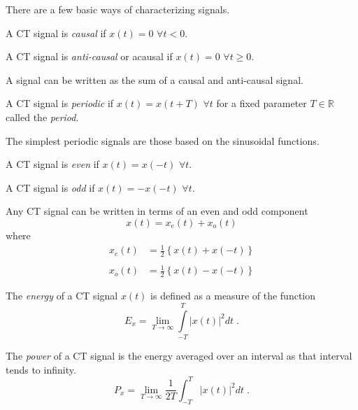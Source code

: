 There are a few basic ways of characterizing signals.

\begin{definition}
  A CT signal is \emph{causal} if $x(t) = 0$ $\forall t < 0$.
\end{definition}
\begin{definition}
  A CT signal is \emph{anti-causal} or acausal if $x(t) = 0$ $\forall t \geq 0$.
\end{definition}

A signal can be written as the sum of a causal and anti-causal signal.

\begin{definition}
  A CT signal is \emph{periodic} if $x(t) = x(t + T)$ $\forall t$ for a fixed parameter $T \in \mathbb{R}$ called the \emph{period}.
\end{definition}
  
The simplest periodic signals are those based on the sinusoidal functions.
  
\begin{definition}
  A CT signal is \emph{even} if $x(t) = x(-t)$ $\forall t$.
\end{definition}

\begin{definition}
  A CT signal is \emph{odd} if $x(t) = -x(-t)$ $\forall t$. 
\end{definition}

Any CT signal can be written in terms of an even and odd component
\[
x(t) = x_e(t) + x_o(t) 
\]
where 
\[
\begin{array}{ll}
  x_e(t) &= \frac{1}{2}\left\{x(t) + x(-t)\right\} \\
  & \\
  x_o(t) &= \frac{1}{2}\left\{x(t) - x(-t)\right\}
\end{array}
\]

\begin{definition}
  The \emph{energy} of a CT signal $x(t)$ is defined as a measure of the function
  \[
  E_x = \lim_{T\rightarrow\infty} \int\limits_{-T}^T \lvert x(t) \rvert^2 dt \; .
  \]
\end{definition}

\begin{definition}
  The \emph{power} of a CT signal is the energy averaged over an interval as that interval tends to infinity.
  \[
  P_x = \lim_{T\rightarrow\infty} \frac{1}{2T} \int_{-T}^T \lvert x(t)\rvert^2 dt \; .
  \]
\end{definition}

